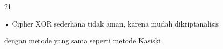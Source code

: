 \documentclass{article}
\begin{document}

21

• Cipher XOR sederhana tidak aman, karena mudah dikriptanalisis 

dengan metode yang sama seperti metode Kasiski
\end{document}
